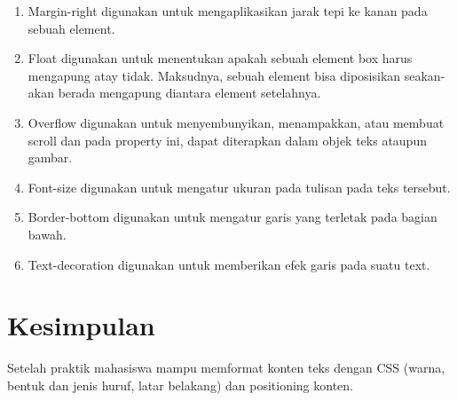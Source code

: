 \documentclass[a4paper,12pt]{article}
\begin{document}
\begin{enumerate}
    \item Margin-right digunakan untuk mengaplikasikan jarak tepi ke kanan pada sebuah element.
    \item Float digunakan untuk menentukan apakah sebuah element box harus mengapung atay tidak. Maksudnya, sebuah element bisa diposisikan seakan-akan berada mengapung diantara element setelahnya.
    \item Overflow digunakan untuk menyembunyikan, menampakkan, atau membuat scroll dan pada property ini, dapat diterapkan dalam objek teks ataupun gambar.
    \item Font-size digunakan untuk mengatur ukuran pada tulisan pada teks tersebut.
    \item Border-bottom digunakan untuk mengatur garis yang terletak pada bagian bawah.
    \item Text-decoration digunakan untuk memberikan efek garis pada suatu text.
\end{enumerate}

\newpage

\section{Kesimpulan}
Setelah praktik mahasiswa mampu memformat konten teks dengan CSS (warna, bentuk dan jenis huruf, latar belakang) dan positioning konten.
\end{document}

